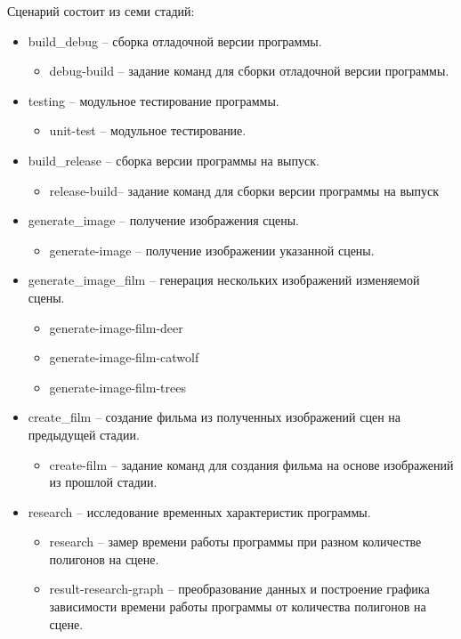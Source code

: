 Сценарий состоит из семи стадий:
\begin{itemize}
	\item build\_debug -- сборка отладочной версии программы.
		\begin{itemize}
			\item debug-build -- задание команд для сборки отладочной версии программы.
		\end{itemize}
	\item testing -- модульное тестирование программы.
		\begin{itemize}
			\item unit-test -- модульное тестирование.
		\end{itemize}
	\item build\_release -- сборка версии программы на выпуск.
		\begin{itemize}
			\item release-build-- задание команд для сборки версии программы на выпуск
		\end{itemize}
	\item generate\_image -- получение изображения сцены.
		\begin{itemize}
			\item generate-image -- получение изображении указанной сцены.
		\end{itemize}
	\item generate\_image\_film -- генерация нескольких изображений изменяемой сцены.
		\begin{itemize}
			\item generate-image-film-deer
			\item generate-image-film-catwolf
			\item generate-image-film-trees
		\end{itemize}
	\item create\_film -- создание фильма из полученных изображений сцен на предыдущей стадии.
		\begin{itemize}
			\item create-film -- задание команд для создания фильма на основе изображений из прошлой стадии.
		\end{itemize}
	\item research -- исследование временных характеристик программы.
		\begin{itemize}
			\item research -- замер времени работы программы при разном количестве полигонов на сцене.
			\item result-research-graph -- преобразование данных и построение графика зависимости времени работы программы от количества полигонов на сцене.
		\end{itemize}
\end{itemize}



